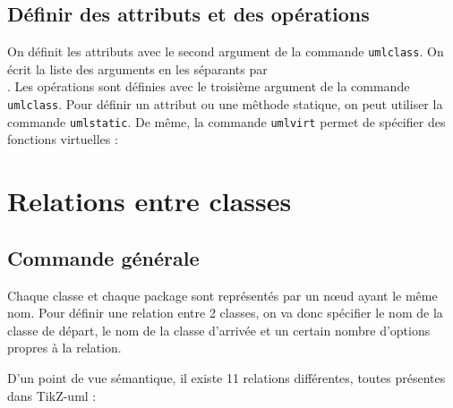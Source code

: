 \documentclass[a4paper,11pt]{report}
\newcommand{\inputTikZ}[1]{%
  }%
\newcommand{\inputTikZ}[1]{%
    \texttt{[image: fig/\#1.pdf]}%
  }%
\newcommand{\tuml}{{\sc TikZ-uml}}
\begin{document}
\subsection{Définir des attributs et des opérations}\label{ss.attrop}

On définit les attributs avec le second argument de la commande {\tt umlclass}. On écrit la liste des arguments en les séparants par {\tt \\}. Les opérations sont définies avec le troisième argument de la commande {\tt umlclass}. Pour définir un attribut ou une mêthode statique, on peut utiliser la commande {\tt umlstatic}. De même, la commande {\tt umlvirt} permet de spécifier des fonctions virtuelles :

\medskip

\begin{minipage}{0.5\textwidth}

\end{minipage}
\begin{minipage}{0.4\textwidth}
\begin{center}
\inputTikZ{attr-and-op}
\end{center}
\end{minipage}

\section{Relations entre classes}\label{s.rel}

\subsection{Commande générale}\label{ss.relgen}

Chaque classe et chaque package sont représentés par un n\oe{}ud ayant le même nom. Pour définir une relation entre 2 classes, on va donc spécifier le nom de la classe de départ, le nom de la classe d'arrivée et un certain nombre d'options propres à la relation.

\medskip

\begin{minipage}{0.5\textwidth}

\end{minipage}
\begin{minipage}{0.4\textwidth}
\begin{center}
\inputTikZ{relation}
\end{center}
\end{minipage}

D'un point de vue sémantique, il existe 11 relations différentes, toutes présentes dans \tuml{} :
\end{document}
